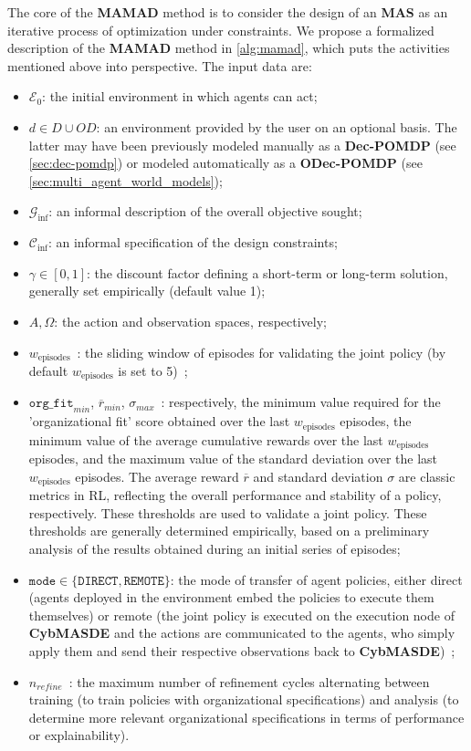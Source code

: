 \documentclass[pdflatex,sn-mathphys-num]{sn-jnl}%
\theoremstyle{thmstyleone}%
\theoremstyle{thmstyletwo}%
\theoremstyle{thmstylethree}%
\begin{document}
The core of the \textbf{MAMAD} method is to consider the design of an \textbf{MAS} as an iterative process of optimization under constraints. We propose a formalized description of the \textbf{MAMAD} method in \autoref{alg:mamad}, which puts the activities mentioned above into perspective. The input data are:
\begin{itemize}
    \item $\mathcal{E}_0$: the initial environment in which agents can act;
    \item $d \in D \cup OD$: an environment provided by the user on an optional basis. The latter may have been previously modeled manually as a \textbf{Dec-POMDP} (see \autoref{sec:dec-pomdp}) or modeled automatically as a \textbf{ODec-POMDP} (see \autoref{sec:multi_agent_world_models});
    \item $\mathcal{G}_{\text{inf}}$: an informal description of the overall objective sought;
    \item $\mathcal{C}_{\text{inf}}$: an informal specification of the design constraints;
    \item $\gamma \in [0,1]$: the discount factor defining a short-term or long-term solution, generally set empirically (default value 1);
    \item $A, \Omega$: the action and observation spaces, respectively;
    \item $w_{\text{episodes}} $~: the sliding window of episodes for validating the joint policy (by default $w_{\text{episodes}}$ is set to 5)~;
    \item $\texttt{org\_fit}_{min}$, $\overline{r}_{min}$, $\sigma_{max} $~: respectively, the minimum value required for the 'organizational fit' score obtained over the last $w_{\text{episodes}}$ episodes, the minimum value of the average cumulative rewards over the last $w_{\text{episodes}}$ episodes, and the maximum value of the standard deviation over the last $w_{\text{episodes}}$ episodes. The average reward $\overline{r}$ and standard deviation $\sigma$ are classic metrics in RL, reflecting the overall performance and stability of a policy, respectively. These thresholds are used to validate a joint policy. These thresholds are generally determined empirically, based on a preliminary analysis of the results obtained during an initial series of episodes;
    \item $\texttt{mode} \in \{\texttt{DIRECT}, \texttt{REMOTE}\}$: the mode of transfer of agent policies, either direct (agents deployed in the environment embed the policies to execute them themselves) or remote (the joint policy is executed on the execution node of \textbf{CybMASDE} and the actions are communicated to the agents, who simply apply them and send their respective observations back to \textbf{CybMASDE})~;
    \item $n_{refine}$~: the maximum number of refinement cycles alternating between training (to train policies with organizational specifications) and analysis (to determine more relevant organizational specifications in terms of performance or explainability).
\end{itemize}
\end{document}
